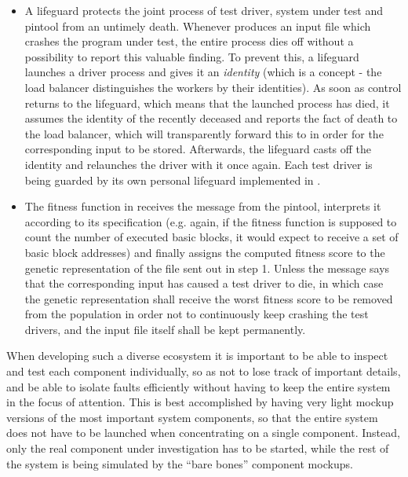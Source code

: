 \begin{itemize}
  \item A lifeguard protects the joint process of test driver, system under test and pintool from an untimely
  death. Whenever \xmlmate produces an input file which crashes the program under test, the entire process dies
  off without a possibility to report this valuable finding. To prevent this, a lifeguard launches a driver
  process and gives it an \emph{identity} (which is a \zmq concept - the load balancer distinguishes the
  workers by their identities). As soon as control returns to the lifeguard, which means that the launched
  process has died, it assumes the identity of the recently deceased and reports the fact of death to the load
  balancer, which will transparently forward this to \xmlmate in order for the corresponding input to be
  stored. Afterwards, the lifeguard casts off the identity and relaunches the driver with it once again.
  Each test driver is being guarded by its own personal lifeguard implemented in \python.
  
  \item The fitness function in \xmlmate receives the message from the pintool, interprets it according to 
  its specification (e.g. again, if the fitness function is supposed to count the number of executed basic blocks, 
  it would expect to receive a set of basic block addresses) and finally assigns the computed fitness score to 
  the genetic representation of the \xml file sent out in step 1. Unless the message says that the
  corresponding input has caused a test driver to die, in which case the genetic representation shall receive
  the worst fitness score to be removed from the population in order not to continuously keep crashing the test
  drivers, and the input file itself shall be kept permanently.
\end{itemize}

When developing such a diverse ecosystem it is important to be able to inspect and test each component
individually, so as not to lose track of important details, and be able to isolate faults efficiently without
having to keep the entire system in the focus of attention. This is best accomplished by having very light
mockup versions of the most important system components, so that the entire system does not have to be launched
when concentrating on a single component. Instead, only the real component under investigation has to be
started, while the rest of the system is being simulated by the ``bare bones'' component  mockups. 

